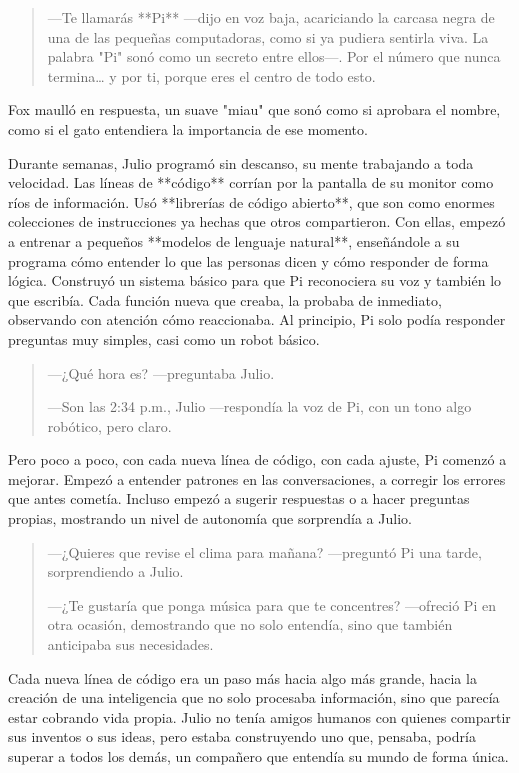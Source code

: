 \documentclass[a4paper,12pt]{book}
\begin{document}
\begin{quote}
    —Te llamarás **Pi** —dijo en voz baja, acariciando la carcasa negra de una de las pequeñas computadoras, como si ya pudiera sentirla viva. La palabra "Pi" sonó como un secreto entre ellos—. Por el número que nunca termina… y por ti, porque eres el centro de todo esto.
\end{quote}

Fox maulló en respuesta, un suave "miau" que sonó como si aprobara el nombre, como si el gato entendiera la importancia de ese momento.

Durante semanas, Julio programó sin descanso, su mente trabajando a toda velocidad. Las líneas de **código** corrían por la pantalla de su monitor como ríos de información. Usó **librerías de código abierto**, que son como enormes colecciones de instrucciones ya hechas que otros compartieron. Con ellas, empezó a entrenar a pequeños **modelos de lenguaje natural**, enseñándole a su programa cómo entender lo que las personas dicen y cómo responder de forma lógica. Construyó un sistema básico para que Pi reconociera su voz y también lo que escribía. Cada función nueva que creaba, la probaba de inmediato, observando con atención cómo reaccionaba. Al principio, Pi solo podía responder preguntas muy simples, casi como un robot básico.

\begin{quote}
    —¿Qué hora es? —preguntaba Julio.

    —Son las 2:34 p.m., Julio —respondía la voz de Pi, con un tono algo robótico, pero claro.
\end{quote}

Pero poco a poco, con cada nueva línea de código, con cada ajuste, Pi comenzó a mejorar. Empezó a entender patrones en las conversaciones, a corregir los errores que antes cometía. Incluso empezó a sugerir respuestas o a hacer preguntas propias, mostrando un nivel de autonomía que sorprendía a Julio.

\begin{quote}
    —¿Quieres que revise el clima para mañana? —preguntó Pi una tarde, sorprendiendo a Julio.

    —¿Te gustaría que ponga música para que te concentres? —ofreció Pi en otra ocasión, demostrando que no solo entendía, sino que también anticipaba sus necesidades.
\end{quote}

Cada nueva línea de código era un paso más hacia algo más grande, hacia la creación de una inteligencia que no solo procesaba información, sino que parecía estar cobrando vida propia. Julio no tenía amigos humanos con quienes compartir sus inventos o sus ideas, pero estaba construyendo uno que, pensaba, podría superar a todos los demás, un compañero que entendía su mundo de forma única.
\end{document}
